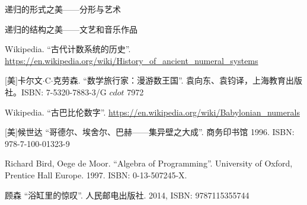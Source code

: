 \documentclass[UTF8]{article}
\begin{document}
递归的形式之美——分形与艺术

递归的结构之美——文艺和音乐作品

\ifx\wholebook\relax \else
\begin{thebibliography}{99}

Wikipedia. ``古代计数系统的历史''. \url{https://en.wikipedia.org/wiki/History_of_ancient_numeral_systems}

[美]卡尔文$\cdot$C$\cdot$克劳森. ``数学旅行家：漫游数王国''. 袁向东、袁钧译，上海教育出版社。ISBN: 7-5320-7883-3/G $cdot$ 7972

Wikipedia. ``古巴比伦数字''. \url{https://en.wikipedia.org/wiki/Babylonian_numerals}

[美]候世达 ``哥德尔、埃舍尔、巴赫——集异壁之大成''. 商务印书馆 1996. ISBN: 978-7-100-01323-9

Richard Bird, Oege de Moor. ``Algebra of Programming''. University of Oxford, Prentice Hall Europe. 1997. ISBN: 0-13-507245-X.

顾森 ``浴缸里的惊叹''. 人民邮电出版社. 2014, ISBN: 9787115355744

\end{thebibliography}

\expandafter\enddocument

\fi
\end{document}
